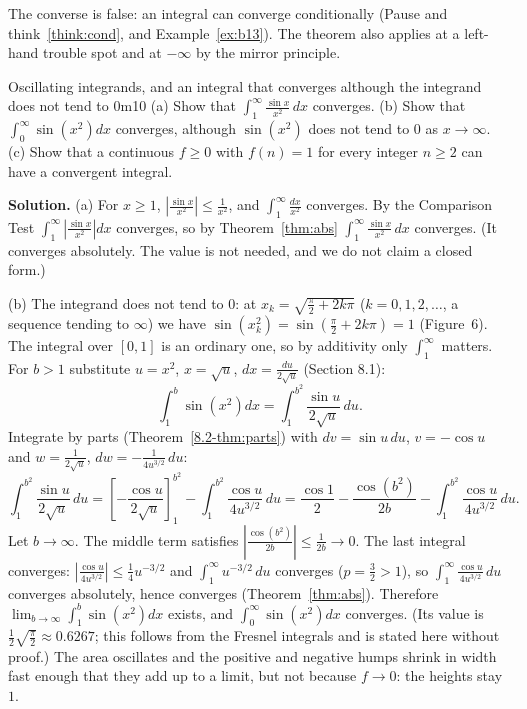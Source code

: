 \documentclass[11pt]{article}
\begin{document}
The converse is false: an integral can converge conditionally (Pause and think~\ref{think:cond}, and Example~\ref{ex:b13}). The theorem also applies at a left-hand trouble spot and at $-\infty$ by the mirror principle.

\begin{exmp}{Oscillating integrands, and an integral that converges although the integrand does not tend to $0$}{m10}
(a) Show that $\displaystyle\int_1^\infty\frac{\sin x}{x^2}\,dx$ converges. (b) Show that $\displaystyle\int_0^\infty\sin\left(x^2\right)dx$ converges, although $\sin\left(x^2\right)$ does not tend to $0$ as $x\to\infty$. (c) Show that a continuous $f\ge0$ with $f(n)=1$ for every integer $n\ge2$ can have a convergent integral.

\textbf{Solution.} (a) For $x\ge1$, $\left\lvert\frac{\sin x}{x^2}\right\rvert\le\frac1{x^2}$, and $\int_1^\infty\frac{dx}{x^2}$ converges. By the Comparison Test $\int_1^\infty\left\lvert\frac{\sin x}{x^2}\right\rvert dx$ converges, so by Theorem~\ref{thm:abs} $\int_1^\infty\frac{\sin x}{x^2}\,dx$ converges. (It converges absolutely. The value is not needed, and we do not claim a closed form.)

(b) The integrand does not tend to $0$: at $x_k=\sqrt{\frac\pi2+2k\pi}$ ($k=0,1,2,\dots$, a sequence tending to $\infty$) we have $\sin\left(x_k^2\right)=\sin\left(\frac\pi2+2k\pi\right)=1$ (Figure~6). The integral over $[0,1]$ is an ordinary one, so by additivity only $\int_1^\infty$ matters. For $b>1$ substitute $u=x^2$, $x=\sqrt u$, $dx=\frac{du}{2\sqrt u}$ (Section 8.1):
\[\int_1^b\sin\left(x^2\right)dx=\int_1^{b^2}\frac{\sin u}{2\sqrt u}\,du .\]
Integrate by parts (Theorem~\ref{8.2-thm:parts}) with $dv=\sin u\,du$, $v=-\cos u$ and $w=\frac1{2\sqrt u}$, $dw=-\frac1{4u^{3/2}}\,du$:
\[\int_1^{b^2}\frac{\sin u}{2\sqrt u}\,du=\left[-\frac{\cos u}{2\sqrt u}\right]_1^{b^2}-\int_1^{b^2}\frac{\cos u}{4u^{3/2}}\,du=\frac{\cos1}2-\frac{\cos\left(b^2\right)}{2b}-\int_1^{b^2}\frac{\cos u}{4u^{3/2}}\,du .\]
Let $b\to\infty$. The middle term satisfies $\left\lvert\frac{\cos(b^2)}{2b}\right\rvert\le\frac1{2b}\to0$. The last integral converges: $\left\lvert\frac{\cos u}{4u^{3/2}}\right\rvert\le\frac14u^{-3/2}$ and $\int_1^\infty u^{-3/2}\,du$ converges ($p=\frac32>1$), so $\int_1^\infty\frac{\cos u}{4u^{3/2}}\,du$ converges absolutely, hence converges (Theorem~\ref{thm:abs}). Therefore $\lim_{b\to\infty}\int_1^b\sin\left(x^2\right)dx$ exists, and $\int_0^\infty\sin\left(x^2\right)dx$ converges. (Its value is $\frac12\sqrt{\frac\pi2}\approx0.6267$; this follows from the Fresnel integrals and is stated here without proof.) The area oscillates and the positive and negative humps shrink in width fast enough that they add up to a limit, but not because $f\to0$: the heights stay $1$.


\end{exmp}
\end{document}
